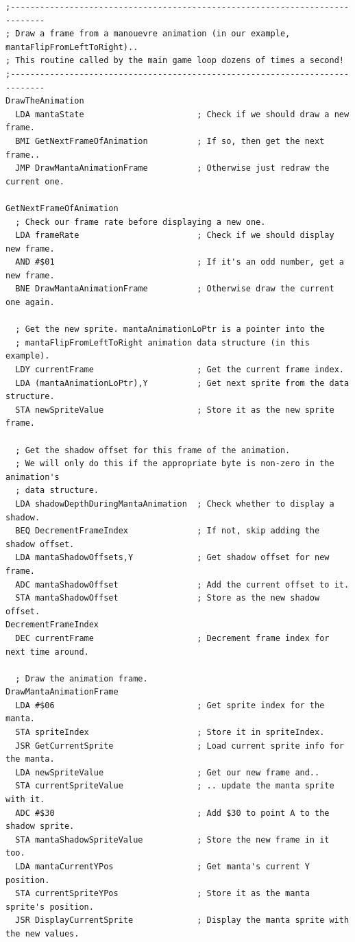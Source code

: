 \clearpage
\begin{lstlisting}[basicstyle=\scriptsize\ttfamily]
;-----------------------------------------------------------------------------
; Draw a frame from a manouevre animation (in our example, mantaFlipFromLeftToRight)..
; This routine called by the main game loop dozens of times a second!
;-----------------------------------------------------------------------------
DrawTheAnimation   
  LDA mantaState                       ; Check if we should draw a new frame.
  BMI GetNextFrameOfAnimation          ; If so, then get the next frame..
  JMP DrawMantaAnimationFrame          ; Otherwise just redraw the current one.

GetNextFrameOfAnimation
  ; Check our frame rate before displaying a new one.
  LDA frameRate                        ; Check if we should display new frame. 
  AND #$01                             ; If it's an odd number, get a new frame.
  BNE DrawMantaAnimationFrame          ; Otherwise draw the current one again.

  ; Get the new sprite. mantaAnimationLoPtr is a pointer into the
  ; mantaFlipFromLeftToRight animation data structure (in this example).
  LDY currentFrame                     ; Get the current frame index.
  LDA (mantaAnimationLoPtr),Y          ; Get next sprite from the data structure.
  STA newSpriteValue                   ; Store it as the new sprite frame.

  ; Get the shadow offset for this frame of the animation.
  ; We will only do this if the appropriate byte is non-zero in the animation's
  ; data structure.
  LDA shadowDepthDuringMantaAnimation  ; Check whether to display a shadow.
  BEQ DecrementFrameIndex              ; If not, skip adding the shadow offset.
  LDA mantaShadowOffsets,Y             ; Get shadow offset for new frame.
  ADC mantaShadowOffset                ; Add the current offset to it.
  STA mantaShadowOffset                ; Store as the new shadow offset.
DecrementFrameIndex
  DEC currentFrame                     ; Decrement frame index for next time around.

  ; Draw the animation frame.
DrawMantaAnimationFrame   
  LDA #$06                             ; Get sprite index for the manta.
  STA spriteIndex                      ; Store it in spriteIndex.
  JSR GetCurrentSprite                 ; Load current sprite info for the manta.
  LDA newSpriteValue                   ; Get our new frame and..
  STA currentSpriteValue               ; .. update the manta sprite with it.
  ADC #$30                             ; Add $30 to point A to the shadow sprite.
  STA mantaShadowSpriteValue           ; Store the new frame in it too.
  LDA mantaCurrentYPos                 ; Get manta's current Y position.
  STA currentSpriteYPos                ; Store it as the manta sprite's position.
  JSR DisplayCurrentSprite             ; Display the manta sprite with the new values.


\end{lstlisting}
